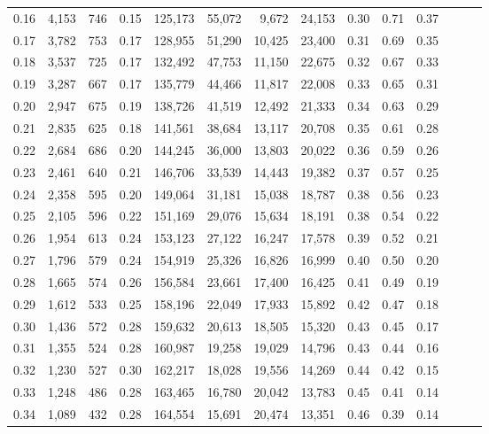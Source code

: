 \begin{tabular}{rrrrrrrrrrrrrr}
0.16 &   4,153 &  746 &  0.15 &  125,173 &   55,072 &   9,672 &  24,153 &  0.30 &  0.71 &      0.37 \\
0.17 &   3,782 &  753 &  0.17 &  128,955 &   51,290 &  10,425 &  23,400 &  0.31 &  0.69 &      0.35 \\
0.18 &   3,537 &  725 &  0.17 &  132,492 &   47,753 &  11,150 &  22,675 &  0.32 &  0.67 &      0.33 \\
0.19 &   3,287 &  667 &  0.17 &  135,779 &   44,466 &  11,817 &  22,008 &  0.33 &  0.65 &      0.31 \\
0.20 &   2,947 &  675 &  0.19 &  138,726 &   41,519 &  12,492 &  21,333 &  0.34 &  0.63 &      0.29 \\
0.21 &   2,835 &  625 &  0.18 &  141,561 &   38,684 &  13,117 &  20,708 &  0.35 &  0.61 &      0.28 \\
0.22 &   2,684 &  686 &  0.20 &  144,245 &   36,000 &  13,803 &  20,022 &  0.36 &  0.59 &      0.26 \\
0.23 &   2,461 &  640 &  0.21 &  146,706 &   33,539 &  14,443 &  19,382 &  0.37 &  0.57 &      0.25 \\
0.24 &   2,358 &  595 &  0.20 &  149,064 &   31,181 &  15,038 &  18,787 &  0.38 &  0.56 &      0.23 \\
0.25 &   2,105 &  596 &  0.22 &  151,169 &   29,076 &  15,634 &  18,191 &  0.38 &  0.54 &      0.22 \\
0.26 &   1,954 &  613 &  0.24 &  153,123 &   27,122 &  16,247 &  17,578 &  0.39 &  0.52 &      0.21 \\
0.27 &   1,796 &  579 &  0.24 &  154,919 &   25,326 &  16,826 &  16,999 &  0.40 &  0.50 &      0.20 \\
0.28 &   1,665 &  574 &  0.26 &  156,584 &   23,661 &  17,400 &  16,425 &  0.41 &  0.49 &      0.19 \\
0.29 &   1,612 &  533 &  0.25 &  158,196 &   22,049 &  17,933 &  15,892 &  0.42 &  0.47 &      0.18 \\
0.30 &   1,436 &  572 &  0.28 &  159,632 &   20,613 &  18,505 &  15,320 &  0.43 &  0.45 &      0.17 \\
0.31 &   1,355 &  524 &  0.28 &  160,987 &   19,258 &  19,029 &  14,796 &  0.43 &  0.44 &      0.16 \\
0.32 &   1,230 &  527 &  0.30 &  162,217 &   18,028 &  19,556 &  14,269 &  0.44 &  0.42 &      0.15 \\
0.33 &   1,248 &  486 &  0.28 &  163,465 &   16,780 &  20,042 &  13,783 &  0.45 &  0.41 &      0.14 \\
0.34 &   1,089 &  432 &  0.28 &  164,554 &   15,691 &  20,474 &  13,351 &  0.46 &  0.39 &      0.14 \\

\end{tabular}
